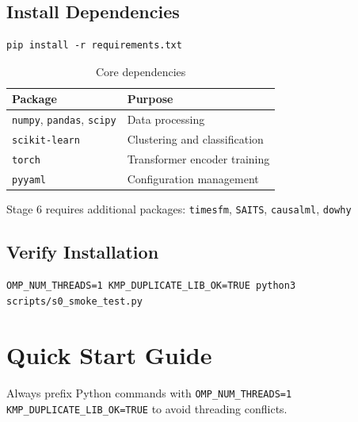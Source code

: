 \documentclass[11pt,a4paper]{article}
\renewcommand{\arraystretch}{1.3}
\begin{document}
\subsection{Install Dependencies}

\begin{lstlisting}
pip install -r requirements.txt
\end{lstlisting}

\begin{table}[H]
\centering
\renewcommand{\arraystretch}{1.3}
\begin{tabular}{lp{8cm}}
\toprule
\textbf{Package} & \textbf{Purpose} \\
\midrule
\rowcolor{lightgray} \texttt{numpy}, \texttt{pandas}, \texttt{scipy} & Data processing \\
\texttt{scikit-learn} & Clustering and classification \\
\rowcolor{lightgray} \texttt{torch} & Transformer encoder training \\
\texttt{pyyaml} & Configuration management \\
\bottomrule
\end{tabular}
\caption{Core dependencies}
\end{table}

\begin{tipbox}
Stage 6 requires additional packages: \texttt{timesfm}, \texttt{SAITS}, \texttt{causalml}, \texttt{dowhy}
\end{tipbox}

\subsection{Verify Installation}

\begin{lstlisting}
OMP_NUM_THREADS=1 KMP_DUPLICATE_LIB_OK=TRUE python3 scripts/s0_smoke_test.py
\end{lstlisting}

\section{Quick Start Guide}

\begin{warningbox}
Always prefix Python commands with \texttt{OMP\_NUM\_THREADS=1 KMP\_DUPLICATE\_LIB\_OK=TRUE} to avoid threading conflicts.
\end{warningbox}
\end{document}
